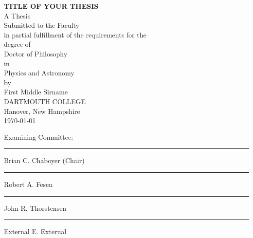 \begin{titlepage}
 \begin{center}
  \MakeUppercase{\bf title of your thesis} \\ %
  A Thesis                 \\
  Submitted to the Faculty \\
  in partial fulfillment of the requirements for the \\
  degree of              \\
  Doctor of Philosophy   \\   %
  in                     \\
  Physics and Astronomy  \\   %
  by                     \\
  First Middle Sirname   \\   %
  DARTMOUTH COLLEGE      \\
  Hanover, New Hampshire \\
  \today
 \end{center}
 \vspace{\baselineskip}
 
 \vspace*{\fill}
 
 \begin{minipage}[b]{\linewidth}
 
    \begin{flushright}
        
        \begin{minipage}[b]{0.45\linewidth}
            \begin{center}
                Examining Committee:
            \end{center}
            \vspace{0.5in}
            \hrule \vspace{0.1in}
            Brian C. Chaboyer (Chair) \\ \vspace{0.3in} %
            \hrule \vspace{0.1in}
            Robert A. Fesen \\ \vspace{0.3in}           %
            \hrule \vspace{0.1in}
            John R. Thorstensen \\ \vspace{0.3in}       %
            \hrule \vspace{0.1in} 
            External E. External                        %
        \end{minipage}
    \end{flushright}
 

\end{minipage}
\end{titlepage}
